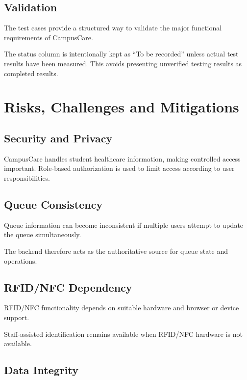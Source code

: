 \documentclass{tietreport}
\begin{document}
\section{Validation}

The test cases provide a structured way to validate the major
functional requirements of CampusCare.

The status column is intentionally kept as ``To be recorded'' unless
actual test results have been measured. This avoids presenting
unverified testing results as completed results.



\chapter{Risks, Challenges and Mitigations}

\section{Security and Privacy}

CampusCare handles student healthcare information, making controlled
access important. Role-based authorization is used to limit access
according to user responsibilities.

\section{Queue Consistency}

Queue information can become inconsistent if multiple users attempt
to update the queue simultaneously.

The backend therefore acts as the authoritative source for queue
state and operations.

\section{RFID/NFC Dependency}

RFID/NFC functionality depends on suitable hardware and browser or
device support.

Staff-assisted identification remains available when RFID/NFC
hardware is not available.

\section{Data Integrity}
\end{document}
